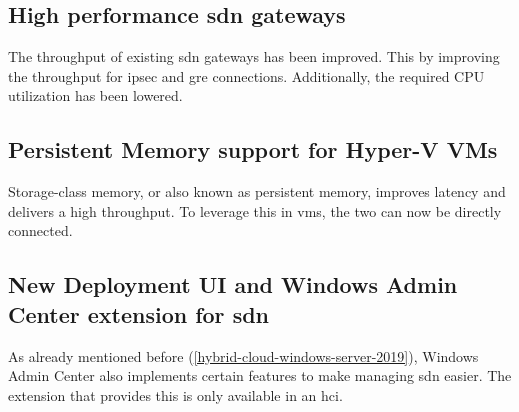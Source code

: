\subsection*{High performance \acrshort{sdn} gateways}
The throughput of existing \acrshort{sdn} gateways has been improved. This by improving the throughput for \acrfull{ipsec} and \acrfull{gre} connections. Additionally, the required CPU utilization has been lowered.
\subsection*{Persistent Memory support for Hyper-V VMs}
Storage-class memory, or also known as persistent memory, improves latency and delivers a high throughput. To leverage this in \acrshort{vm}s, the two can now be directly connected.
\subsection*{New Deployment UI and Windows Admin Center extension for \acrshort{sdn}}
As already mentioned before (\ref{hybrid-cloud-windows-server-2019}), Windows Admin Center also implements certain features to make managing \acrshort{sdn} easier. The extension that provides this is only available in an \acrshort{hci}.

\clearpage

